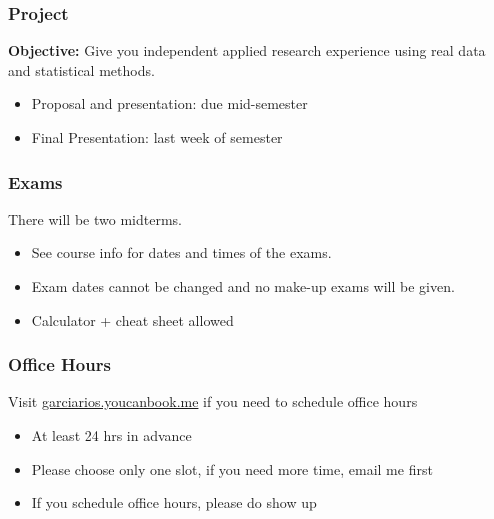 \documentclass[11pt]{beamer}
\begin{document}
\begin{frame}
\frametitle{Project}

\alert{\textbf{Objective:}} Give you independent applied research experience using real data and 
statistical methods.

\begin{itemize}

\item Proposal and presentation: due mid-semester

\item Final Presentation: last week of semester


\end{itemize}

\end{frame}





\begin{frame}
\frametitle{Exams}



There will be two midterms.
\begin{itemize}
\item See course info for dates and times of the exams. 
\item Exam dates cannot be changed and no make-up exams will be given.
\item Calculator + cheat sheet allowed

\end{itemize}

\end{frame}




\begin{frame}
\frametitle{Office Hours}
Visit \url{garciarios.youcanbook.me} if you need to schedule office hours
\begin{itemize}
\item At least 24 hrs in advance
\item Please choose only one slot, if you need more time, email me first 
\item If you schedule office hours, please do show up 
\end{itemize}
\end{frame}
\end{document}
